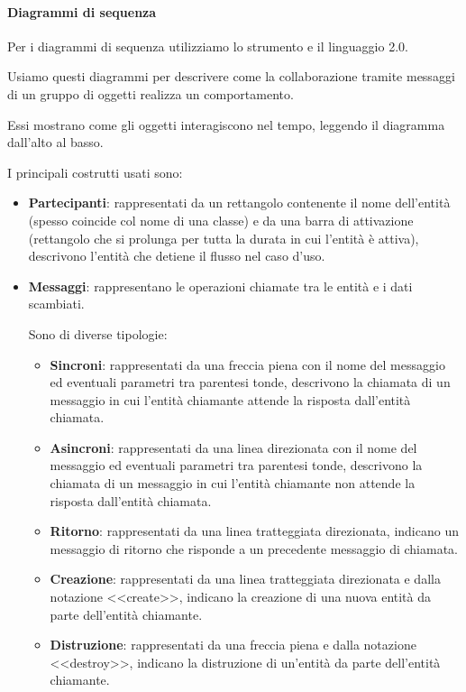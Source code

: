 		\paragraph{Diagrammi di sequenza}\label{PP:Sviluppo:DiagrammiSequenza}
		Per i diagrammi di sequenza utilizziamo lo strumento  e il linguaggio  2.0.\par
        Usiamo questi diagrammi per descrivere come la collaborazione tramite messaggi di un gruppo di oggetti realizza un comportamento.\par
        Essi mostrano come gli oggetti interagiscono nel tempo, leggendo il diagramma dall'alto al basso.\par
        I principali costrutti usati sono:
        \begin{itemize}
            \item \textbf{Partecipanti}: rappresentati da un rettangolo contenente il nome dell'entità (spesso coincide col nome di una classe) e da una barra di attivazione (rettangolo che si prolunga per tutta la durata in cui l'entità è attiva), descrivono l'entità che detiene il flusso nel caso d'uso.
            \item \textbf{Messaggi}: rappresentano le operazioni chiamate tra le entità e i dati scambiati.\par
            Sono di diverse tipologie:
            \begin{itemize}
                \item \textbf{Sincroni}: rappresentati da una freccia piena con il nome del messaggio ed eventuali parametri tra parentesi tonde, descrivono la chiamata di un messaggio in cui l'entità chiamante attende la risposta dall'entità chiamata.
                \item \textbf{Asincroni}: rappresentati da una linea direzionata con il nome del messaggio ed eventuali parametri tra parentesi tonde, descrivono la chiamata di un messaggio in cui l'entità chiamante non attende la risposta dall'entità chiamata.
                \item \textbf{Ritorno}: rappresentati da una linea tratteggiata direzionata, indicano un messaggio di ritorno che risponde a un precedente messaggio di chiamata.
                \item \textbf{Creazione}: rappresentati da una linea tratteggiata direzionata e dalla notazione <<create>>, indicano la creazione di una nuova entità da parte dell'entità chiamante.
                \item \textbf{Distruzione}: rappresentati da una freccia piena e dalla notazione <<destroy>>, indicano la distruzione di un'entità da parte dell'entità chiamante.
            \end{itemize}
        \end{itemize}
